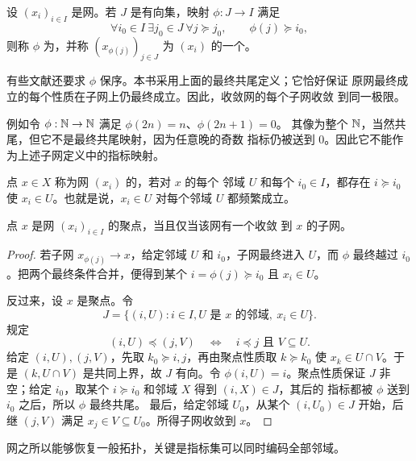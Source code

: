 \begin{definition}[子网]
设 \((x_i)_{i\in I}\) 是网。若 \(J\) 是有向集，映射
\(\phi:J\to I\) 满足
\[
 \forall i_0\in I\ \exists j_0\in J\ \forall j\succcurlyeq j_0,
 \qquad \phi(j)\succcurlyeq i_0,
\]
则称 \(\phi\) 为，并称
\((x_{\phi(j)})_{j\in J}\) 为 \((x_i)\) 的一个。
\end{definition}

有些文献还要求 \(\phi\) 保序。本书采用上面的最终共尾定义；它恰好保证
原网最终成立的每个性质在子网上仍最终成立。因此，收敛网的每个子网收敛
到同一极限。

例如令 \(\phi:\mathbb{N}\to\mathbb{N}\) 满足 \(\phi(2n)=n\)、\(\phi(2n+1)=0\)。
其像为整个 \(\mathbb{N}\)，当然共尾，但它不是最终共尾映射，因为任意晚的奇数
指标仍被送到 \(0\)。因此它不能作为上述子网定义中的指标映射。

\begin{definition}[网的聚点]
点 \(x\in X\) 称为网 \((x_i)\) 的，若对 \(x\) 的每个
邻域 \(U\) 和每个 \(i_0\in I\)，都存在 \(i\succcurlyeq i_0\) 使
\(x_i\in U\)。也就是说，\(x_i\in U\) 对每个邻域 \(U\) 都频繁成立。
\end{definition}

\begin{theorem}[聚点与收敛子网]
\label{thm:net-cluster-subnet}
点 \(x\) 是网 \((x_i)_{i\in I}\) 的聚点，当且仅当该网有一个收敛
到 \(x\) 的子网。
\end{theorem}

\begin{proof}
若子网 \(x_{\phi(j)}\to x\)，给定邻域 \(U\) 和 \(i_0\)，子网最终进入
\(U\)，而 \(\phi\) 最终越过 \(i_0\)。把两个最终条件合并，便得到某个
\(i=\phi(j)\succcurlyeq i_0\) 且 \(x_i\in U\)。

反过来，设 \(x\) 是聚点。令
\[
 J=\{(i,U):i\in I, U\text{ 是 }x\text{ 的邻域},\ x_i\in U\}.
\]
规定
\[
 (i,U)\preccurlyeq(j,V)
 \quad\Longleftrightarrow\quad i\preccurlyeq j\text{ 且 }V\subseteq U.
\]
给定 \((i,U),(j,V)\)，先取 \(k_0\succcurlyeq i,j\)，再由聚点性质取
\(k\succcurlyeq k_0\) 使 \(x_k\in U\cap V\)。于是
\((k,U\cap V)\) 是共同上界，故 \(J\) 有向。令
\(\phi(i,U)=i\)。聚点性质保证 \(J\) 非空；给定 \(i_0\)，取某个
\(i\succcurlyeq i_0\) 和邻域 \(X\) 得到 \((i,X)\in J\)，其后的
指标都被 \(\phi\) 送到 \(i_0\) 之后，所以 \(\phi\) 最终共尾。
最后，给定邻域 \(U_0\)，从某个 \((i,U_0)\in J\) 开始，后继
\((j,V)\) 满足 \(x_j\in V\subseteq U_0\)。所得子网收敛到 \(x\)。
\end{proof}

网之所以能够恢复一般拓扑，关键是指标集可以同时编码全部邻域。

